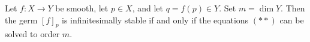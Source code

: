 %

\begin{theorem}
Let $f: X \to Y$ be smooth, let $p \in X$, and let $q = f(p) \in Y$.
Set $m = \dim Y$.
Then the germ $[f]_p$ is infinitesimally stable if and only if the equations $(**)$ can be solved to order $m$.
\end{theorem}
